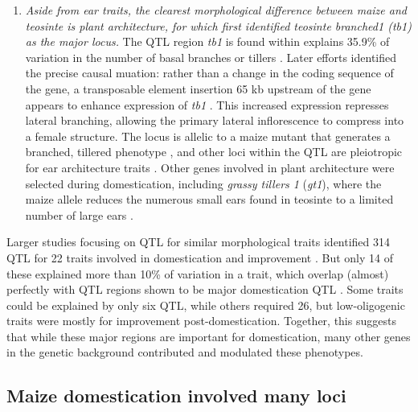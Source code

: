 \documentclass[9pt,twocolumn,twoside]{rilabRxiv}
\begin{document}
\begin{enumerate}
\item \textit{Aside from ear traits, the clearest morphological difference between maize and teosinte is plant architecture, for which
 \citet{doebley1995} first identified \textit{teosinte branched1} (\textit{tb1}) as the major locus. }
 The QTL region \textit{tb1} is found within explains 35.9\% of variation in the number of basal branches or tillers \citep{doebley1991}.
 Later efforts identified the precise causal muation: rather than a change in the coding sequence of the gene, a transposable element insertion 65 kb upstream of the gene appears to enhance expression of \textit{tb1} \citep{studer2011}.
 This increased expression represses lateral branching, allowing the primary lateral inflorescence to compress into a female structure.
 The locus is allelic to a maize mutant that generates a branched, tillered phenotype \citep{burnham1959}, and other loci within the QTL are pleiotropic for ear architecture traits \citep{studer2011fract}.
 Other genes involved in plant architecture were selected during domestication, including \textit{grassy tillers 1} (\textit{gt1}), where the maize allele reduces the numerous small ears found in teosinte to a limited number of large ears \citep{wills2017}.


 \end{enumerate}


Larger studies focusing on QTL for similar morphological traits identified 314 QTL for 22 traits involved in domestication and improvement \citep{briggs2007}.
But only 14 of these explained more than 10\% of variation in a trait, which overlap (almost) perfectly with QTL regions shown to be major domestication QTL \citep{doebley1993}.
Some traits could be explained by only six QTL, while others required 26, but low-oligogenic traits were mostly for improvement post-domestication.
Together, this suggests that while these major regions are important for domestication, many other genes in the genetic background contributed and modulated these phenotypes.

\subsection*{Maize domestication involved many loci}
\end{document}

